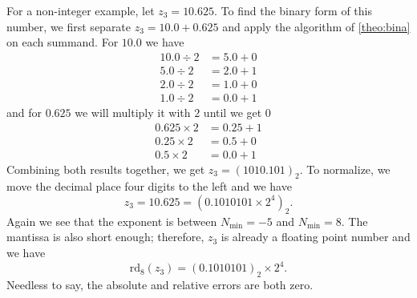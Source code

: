 \begin{exmp} \label{exmp:three}
    For a non-integer example, let \(z_3 = 10.625\). To find the binary form of this number, we first separate \(z_3 = 10.0 + 0.625\) and apply the algorithm of \ref{theo:bina} on each summand. For \(10.0\) we have
    \begin{align*}
        10.0 \div 2 &= 5.0 + 0 \\
        5.0 \div 2 &= 2.0 + 1 \\
        2.0 \div 2 &= 1.0 + 0 \\
        1.0 \div 2 &= 0.0 + 1
    \end{align*}
    and for \(0.625\) we will multiply it with \(2\) until we get \(0\)
    \begin{align*}
        0.625 \times 2 &= 0.25 + 1 \\
        0.25 \times 2 &= 0.5 + 0 \\
        0.5 \times 2 &= 0.0 + 1
    \end{align*}
    Combining both results together, we get \(z_3 = (1010.101)_2\). To normalize, we move the decimal place four digits to the left and we have
    \begin{equation*}
        z_3 = 10.625 = (0.1010101 \times 2^4)_2 \text{.}
    \end{equation*}
    Again we see that the exponent is between \(N_{\text{min}} = -5\) and \(N_{\text{min}} = 8\). The mantissa is also short enough; therefore, \(z_3\) is already a floating point number and we have
    \begin{equation*}
        \text{rd}_8(z_3) =  (0.1010101)_2 \times 2^4 \text{.}
    \end{equation*}
    Needless to say, the absolute and relative errors are both zero.
\end{exmp}
%
%
